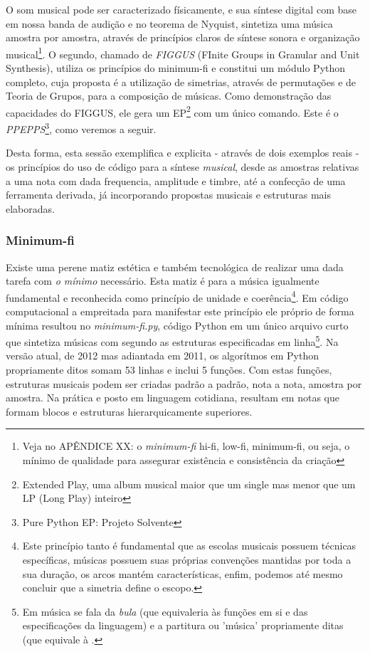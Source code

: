 O som musical pode ser caracterizado físicamente, e sua síntese digital com base em nossa banda de audição e no teorema de Nyquist, sintetiza uma música amostra por amostra, através de princípios
claros de síntese sonora e organização musical\footnote{Veja no APÊNDICE XX: o \emph{minimum-fi} hi-fi, low-fi, minimum-fi, ou seja,
o mínimo de qualidade para assegurar existência e consistência
da criação}. O segundo, chamado de \emph{FIGGUS} (FInite
Groups in Granular and Unit Synthesis), utiliza os princípios do minimum-fi e constitui
um módulo Python completo, cuja proposta é a utilização de simetrias, através de
permutações e de Teoria de Grupos, para a composição de músicas. Como demonstração
das capacidades do FIGGUS, ele gera um EP\footnote{Extended Play, uma album musical maior que um single mas menor que um LP (Long Play) inteiro} com um único comando. Este é o
\emph{PPEPPS}\footnote{Pure Python EP: Projeto Solvente}, como veremos a seguir.

Desta forma, esta sessão exemplifica e explicita - através de dois exemplos reais - os
princípios do uso de código para a síntese \emph{musical}, desde as amostras
relativas a uma nota com dada frequencia, amplitude e timbre, até a confecção
de uma ferramenta derivada, já incorporando propostas musicais e estruturas
mais elaboradas.

      \subsubsection{Minimum-fi}

Existe uma perene matiz estética e também tecnológica
de realizar uma dada tarefa com \emph{o mínimo} necessário.
Esta matiz é para a música igualmente
fundamental e reconhecida como
princípio de unidade e coerência\footnote{Este princípio tanto é fundamental
que as escolas musicais possuem técnicas específicas, músicas possuem suas
próprias convenções mantidas por toda a sua duração, os arcos mantém características,
enfim, podemos até mesmo concluir que a simetria define o escopo.}. Em código computacional
a empreitada para manifestar este princípio ele próprio de forma mínima
resultou no \emph{minimum-fi.py}, código Python em um único arquivo curto que sintetiza
músicas com segundo as estruturas especificadas em linha\footnote{Em música se fala da \emph{bula} (que equivaleria
às funções em si e das especificações da linguagem) e a partitura ou 'música' propriamente ditas (que equivale à .}.
Na versão atual, de 2012 mas adiantada em 2011, os algorítmos 
em Python propriamente ditos somam 
53 linhas e inclui 5 funções. Com estas funções, estruturas musicais podem 
ser criadas padrão a padrão, nota a nota, amostra por amostra. Na prática e posto em
linguagem cotidiana, resultam em notas que formam
blocos e estruturas hierarquicamente superiores.


